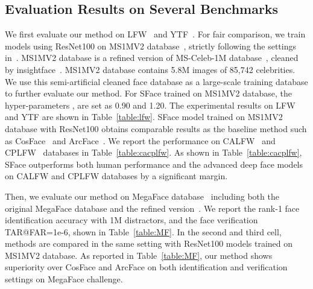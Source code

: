 \documentclass[journal,comsoc]{IEEEtran}
\begin{document}
\subsection{Evaluation Results on Several Benchmarks}
We first evaluate our method on LFW~\cite{LFWTech} and YTF~\cite{Wolf2011Face}. For fair comparison, we train models using ResNet100 on MS1MV2 database~\cite{guo2016msceleb}, strictly following the settings in~\cite{deng2019arcface}. MS1MV2 database is a refined version of MS-Celeb-1M database~\cite{guo2016msceleb}, cleaned by insightface~\cite{deng2019arcface}. MS1MV2 database contains 5.8M images of 85,742 celebrities. We use this semi-artificial cleaned face database as a large-scale training database to further evaluate our method. For SFace trained on MS1MV2 database, the hyper-parameters ,  are set as 0.90 and 1.20. The experimental results on LFW and YTF are shown in Table~\ref{table:lfw}. SFace model trained on MS1MV2 database with ResNet100 obtains comparable results as the baseline method such as CosFace~\cite{Wang2018CosFace} and ArcFace~\cite{deng2019arcface}. We report the performance on CALFW~\cite{zheng2017CALFW} and CPLFW~\cite{CPLFWTech} databases in Table~\ref{table:cacplfw}. As shown in Table~\ref{table:cacplfw}, SFace outperforms both human performance and the advanced deep face models on CALFW and CPLFW databases by a significant margin. 

Then, we evaluate our method on MegaFace database~\cite{kemelmacher2016megaface} including both the original MegaFace database and the refined version~\cite{deng2019arcface}. We report the rank-1 face identification accuracy with 1M distractors, and the face verification TAR@FAR=1e-6, shown in Table~\ref{table:MF}. In the second and third cell, methods are compared in the same setting with ResNet100 models trained on MS1MV2 database. As reported in Table~\ref{table:MF}, our method shows superiority over CosFace and ArcFace on both identification and verification settings on MegaFace challenge. 
\end{document}
